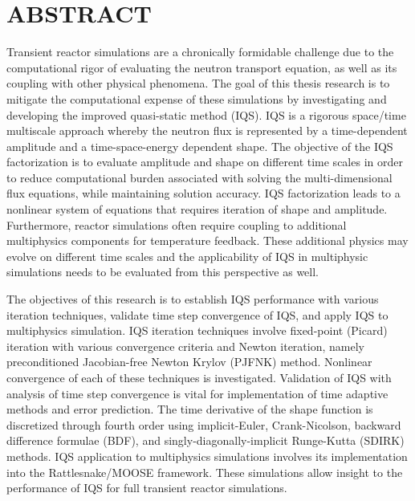 %
%
%

\chapter*{ABSTRACT}

\pagestyle{plain} %
\setcounter{page}{2}

\indent Transient reactor simulations are a chronically formidable challenge due to the computational rigor of evaluating the neutron transport equation, as well as its coupling with other physical phenomena. The goal of this thesis research is to mitigate the computational expense of these simulations by investigating and developing the improved quasi-static method (IQS). IQS is a rigorous space/time multiscale approach whereby the neutron flux is represented by a time-dependent amplitude and a time-space-energy dependent shape.  The objective of the IQS factorization is to evaluate amplitude and shape on different time scales in order to reduce computational burden associated with solving the multi-dimensional flux equations, while maintaining solution accuracy. IQS factorization leads to a nonlinear system of equations that requires iteration of shape and amplitude. Furthermore, reactor simulations often require coupling to additional multiphysics components for temperature feedback. These additional physics may evolve on different time scales and the applicability of IQS in multiphysic simulations needs to be evaluated from this perspective as well.

The objectives of this research is to establish IQS performance with various iteration techniques, validate time step convergence of IQS, and apply IQS to multiphysics simulation. IQS iteration techniques involve fixed-point (Picard) iteration with various convergence criteria and Newton iteration, namely preconditioned Jacobian-free Newton Krylov (PJFNK) method. Nonlinear convergence of each of these techniques is investigated. Validation of IQS with analysis of time step convergence is vital for implementation of time adaptive methods and error prediction. The time derivative of the shape function is discretized through fourth order using implicit-Euler, Crank-Nicolson, backward difference formulae (BDF), and singly-diagonally-implicit Runge-Kutta (SDIRK) methods. IQS application to multiphysics simulations involves its implementation into the Rattlesnake/MOOSE framework. These simulations allow insight to the performance of IQS for full transient reactor simulations.

